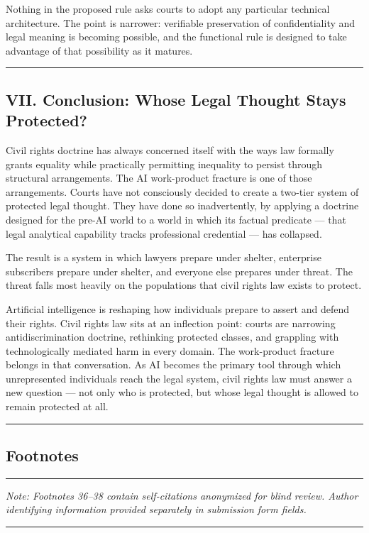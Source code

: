 \documentclass[
  12pt,
]{article}
\begin{document}
Nothing in the proposed rule asks courts to adopt any particular
technical architecture. The point is narrower: verifiable preservation
of confidentiality and legal meaning is becoming possible, and the
functional rule is designed to take advantage of that possibility as it
matures.

\begin{center}\rule{0.5\linewidth}{0.5pt}\end{center}

\subsection{VII. Conclusion: Whose Legal Thought Stays
Protected?}\label{vii-conclusion-whose-legal-thought-stays-protected}

Civil rights doctrine has always concerned itself with the ways law
formally grants equality while practically permitting inequality to
persist through structural arrangements. The AI work-product fracture is
one of those arrangements. Courts have not consciously decided to create
a two-tier system of protected legal thought. They have done so
inadvertently, by applying a doctrine designed for the pre-AI world to a
world in which its factual predicate --- that legal analytical
capability tracks professional credential --- has collapsed.

The result is a system in which lawyers prepare under shelter,
enterprise subscribers prepare under shelter, and everyone else prepares
under threat. The threat falls most heavily on the populations that
civil rights law exists to protect.

Artificial intelligence is reshaping how individuals prepare to assert
and defend their rights. Civil rights law sits at an inflection point:
courts are narrowing antidiscrimination doctrine, rethinking protected
classes, and grappling with technologically mediated harm in every
domain. The work-product fracture belongs in that conversation. As AI
becomes the primary tool through which unrepresented individuals reach
the legal system, civil rights law must answer a new question --- not
only who is protected, but whose legal thought is allowed to remain
protected at all.

\begin{center}\rule{0.5\linewidth}{0.5pt}\end{center}

\subsection{Footnotes}\label{footnotes}

\begin{center}\rule{0.5\linewidth}{0.5pt}\end{center}

\emph{Note: Footnotes 36--38 contain self-citations anonymized for blind
review. Author identifying information provided separately in submission
form fields.}

\begin{center}\rule{0.5\linewidth}{0.5pt}\end{center}
\end{document}
